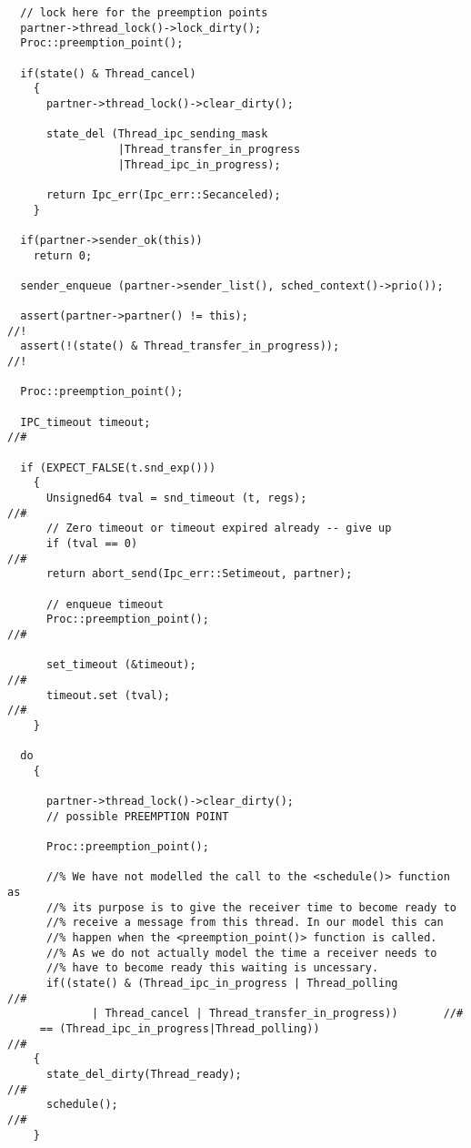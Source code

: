 \begin{lstlisting}
  // lock here for the preemption points
  partner->thread_lock()->lock_dirty();
  Proc::preemption_point();

  if(state() & Thread_cancel)
    {
      partner->thread_lock()->clear_dirty();

      state_del (Thread_ipc_sending_mask
                 |Thread_transfer_in_progress
                 |Thread_ipc_in_progress);

      return Ipc_err(Ipc_err::Secanceled);
    }
  
  if(partner->sender_ok(this))
    return 0;
  
  sender_enqueue (partner->sender_list(), sched_context()->prio());

  assert(partner->partner() != this);                                      //!
  assert(!(state() & Thread_transfer_in_progress));                        //!

  Proc::preemption_point();

  IPC_timeout timeout;                                                     //#
  
  if (EXPECT_FALSE(t.snd_exp()))
    {
      Unsigned64 tval = snd_timeout (t, regs);                             //#
      // Zero timeout or timeout expired already -- give up
      if (tval == 0)                                                       //#
	  return abort_send(Ipc_err::Setimeout, partner);
      
      // enqueue timeout
      Proc::preemption_point();                                            //# 
      
      set_timeout (&timeout);                                              //#
      timeout.set (tval);                                                  //#
    }

  do
    {

      partner->thread_lock()->clear_dirty();
      // possible PREEMPTION POINT

      Proc::preemption_point();

      //% We have not modelled the call to the <schedule()> function as
      //% its purpose is to give the receiver time to become ready to
      //% receive a message from this thread. In our model this can
      //% happen when the <preemption_point()> function is called.
      //% As we do not actually model the time a receiver needs to
      //% have to become ready this waiting is uncessary.
      if((state() & (Thread_ipc_in_progress | Thread_polling               //#
		     | Thread_cancel | Thread_transfer_in_progress))       //#
	 == (Thread_ipc_in_progress|Thread_polling))                       //#
	{
	  state_del_dirty(Thread_ready);                                   //#
	  schedule();                                                      //#
	}


\end{lstlisting}
